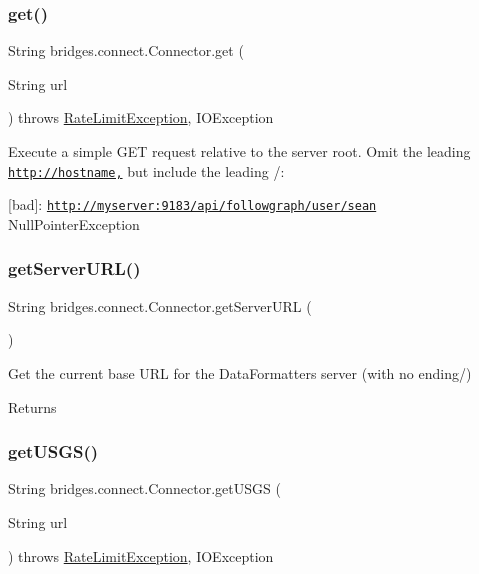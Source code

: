 \subsubsection{\texorpdfstring{get()}{get()}}
{\footnotesize\ttfamily String bridges.\+connect.\+Connector.\+get (\begin{DoxyParamCaption}\item[{String}]{url }\end{DoxyParamCaption}) throws \mbox{\hyperlink{classbridges_1_1validation_1_1_rate_limit_exception}{Rate\+Limit\+Exception}}, I\+O\+Exception}

Execute a simple G\+ET request relative to the server root. Omit the leading \href{http://hostname,}{\tt http\+://hostname,} but include the leading /\+:

\mbox{[}bad\mbox{]}\+: \href{http://myserver:9183/api/followgraph/user/sean}{\tt http\+://myserver\+:9183/api/followgraph/user/sean} Null\+Pointer\+Exception \mbox{\label{classbridges_1_1connect_1_1_connector_a0b9809180aac96a83e31e224ab5ed6ec}} 
\subsubsection{\texorpdfstring{get\+Server\+U\+R\+L()}{getServerURL()}}
{\footnotesize\ttfamily String bridges.\+connect.\+Connector.\+get\+Server\+U\+RL (\begin{DoxyParamCaption}{ }\end{DoxyParamCaption})}

Get the current base U\+RL for the Data\+Formatters server (with no ending/) \begin{DoxyReturn}{Returns}

\end{DoxyReturn}
\mbox{\label{classbridges_1_1connect_1_1_connector_a1781405c9b38c338bce042bf7ff23eaf}} 
\subsubsection{\texorpdfstring{get\+U\+S\+G\+S()}{getUSGS()}}
{\footnotesize\ttfamily String bridges.\+connect.\+Connector.\+get\+U\+S\+GS (\begin{DoxyParamCaption}\item[{String}]{url }\end{DoxyParamCaption}) throws \mbox{\hyperlink{classbridges_1_1validation_1_1_rate_limit_exception}{Rate\+Limit\+Exception}}, I\+O\+Exception}

